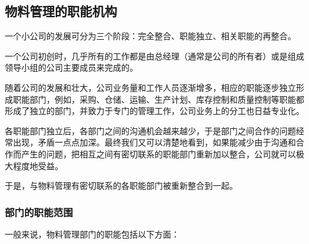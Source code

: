 \subsection { 物料管理的职能机构}

    一个小公司的发展可分为三个阶段：完全整合、职能独立、相关职能的再整合。

    一个公司初创时，几乎所有的工作都是由总经理（通常是公司的所有者）或是组成领导小组的公司主要成员来完成的。

    随着公司的发展和壮大，公司业务量和工作人员逐渐增多，相应的职能逐步独立形成职能部门，例如，采购、仓储、运输、生产计划、库存控制和质量控制等职能都形成了独立的部门，并致力于专门的管理工作，公司业务上的分工也日益专业化。

    各职能部门独立后，各部门之间的沟通机会越来越少，于是部门之间合作的问题经常出现，矛盾一点点加深。最终我们又可以清楚地看到，如果能减少由于沟通和合作而产生的问题，把相互之间有密切联系的职能部门重新加以整合，公司就可以极大程度地受益。

    于是，与物料管理有密切联系的各职能部门被重新整合到一起。

\subsubsection {部门的职能范围}

    一般来说，物料管理部门的职能包括以下方面：

